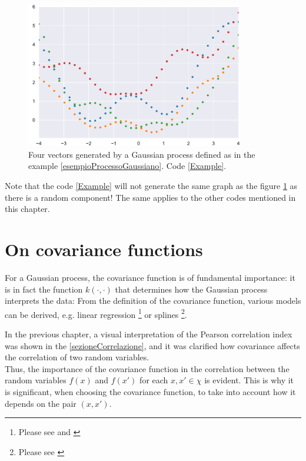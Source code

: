 \begin{ese}
\begin{figure}[h]
    \centering
    \includegraphics[width=0.85\textwidth]{images/Gaussian process/esempioProcessoGaussiano.pdf}
    \caption{Four vectors generated by a Gaussian process defined as in the example \ref{esempioProcessoGaussiano}. Code \ref{Example}.}
    \label{esempioProcessoGaussianoImmagine}
\end{figure}

Note that the code \ref{Example} will not generate the same graph as the figure \ref{esempioProcessoGaussianoImmagine} as there is a random component! The same applies to the other codes mentioned in this chapter.
\end{ese}


\newpage




\section{On covariance functions}
For a Gaussian process, the covariance function is of fundamental importance: it is in fact the function $k(\cdot,\cdot)$ that determines how the Gaussian process interprets the data: From the definition of the covariance function, various models can be derived, e.g. linear regression \footnote{Please see \cite{rasmussen_gaussian_2006} and \cite{williams_prediction_1998}} or splines \footnote{Please see \cite{kimeldorf_correspondence_1970}}.\\
\begin{oss}
  In the previous chapter, a visual interpretation of the Pearson correlation index was shown in the \ref{sezioneCorrelazione}, and it was clarified how covariance affects the correlation of two random variables.\\
  Thus, the importance of the covariance function in the correlation between the random variables $f(x)$ and $f(x')$ for each $x,x'\in \chi$ is evident. This is why it is significant, when choosing the covariance function, to take into account how it depends on the pair $(x,x')$.
\end{oss}

